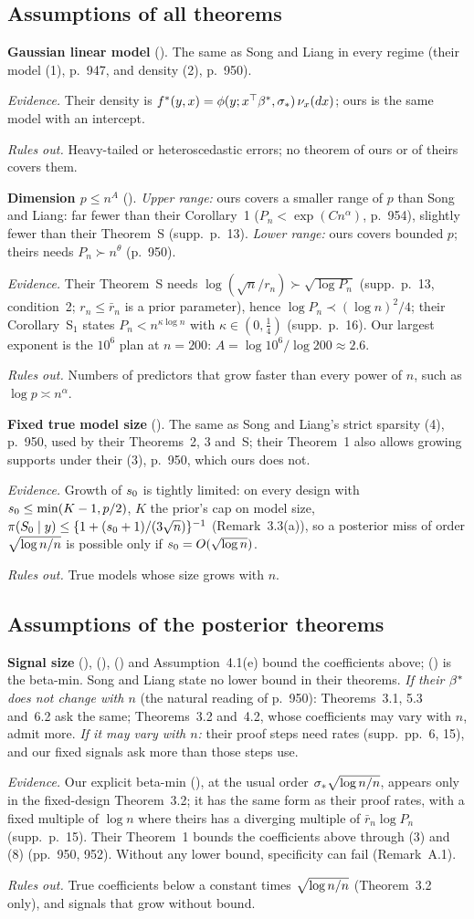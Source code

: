 \documentclass[11pt]{article}
\newcommand{\lab}[1]{\textup{(\asmdisp{#1})}}
\newcommand{\SL}{Song and Liang}
\newcommand{\ahead}[3]{\par\smallskip\noindent\textbf{#1} #2. #3\par}
\newcommand{\ev}[1]{\noindent\emph{Evidence.} #1\par}
\newcommand{\ro}[1]{\noindent\emph{Rules out.} #1\par}
\begin{document}
\subsection{Assumptions of all theorems}\label{sec:a-all}

\ahead{Gaussian linear model}{\lab{GL}}{The same as \SL{} in every regime (their model (1), p.~947, and density (2), p.~950).}
\ev{Their density is $f^*(y,x)=\phi(y;x^\top\beta^*,\sigma_*)\,\nu_x(dx)$; ours is the same model with an intercept.}
\ro{Heavy-tailed or heteroscedastic errors; no theorem of ours or of theirs covers them.}

\ahead{Dimension $p\le n^A$}{\lab{DIM}}{\emph{Upper range:} ours covers a smaller range of $p$ than \SL: far fewer than their Corollary~1
($P_n<\exp(Cn^\alpha)$, p.~954), slightly fewer than their Theorem~S (supp.\ p.~13). \emph{Lower range:} ours covers
bounded $p$; theirs needs $P_n\succ n^\theta$ (p.~950).}
\ev{Their Theorem~S needs $\log(\sqrt n/r_n)\succ\sqrt{\log P_n}$ (supp.\ p.~13, condition~2; $r_n\le\bar r_n$ is a prior parameter), hence
$\log P_n\prec(\log n)^2/4$; their Corollary~S$_1$ states $P_n<n^{\kappa\log n}$ with $\kappa\in(0,\tfrac14)$ (supp.\
p.~16). Our largest exponent is the $10^6$ plan at
$n=200$: $A=\log10^6/\log200\approx2.6$.}
\ro{Numbers of predictors that grow faster than every power of $n$, such as $\log p\asymp n^\alpha$.}

\ahead{Fixed true model size}{\lab{SP}}{The same as \SL's strict sparsity (4), p.~950, used by their Theorems~2, 3 and~S;
their Theorem~1 also allows growing supports under their (3), p.~950, which ours does not.}
\ev{Growth of $s_0$ is tightly limited: on every design with $s_0\le\min(K-1,p/2)$, $K$ the prior's cap on model
size, $\pi(S_0\mid y)\le\{1+(s_0+1)/(3\sqrt n)\}^{-1}$
(Remark~3.3(a)), so a posterior miss of order $\sqrt{\log n/n}$ is possible only if $s_0=O(\sqrt{\log n})$.}
\ro{True models whose size grows with $n$.}

\subsection{Assumptions of the posterior theorems}\label{sec:a-post}

\ahead{Signal size}{\lab{BC}, \lab{FSb}, \lab{FSt} and Assumption~4.1(e) bound the coefficients above; \lab{BM} is
the beta-min}{\SL{} state no lower bound in their theorems. \emph{If their $\beta^*$ does not change with $n$} (the natural
reading of p.~950): Theorems~3.1, 5.3 and~6.2 ask the same; Theorems~3.2 and~4.2, whose
coefficients may vary with $n$, admit more. \emph{If it may vary with $n$:} their proof steps need rates (supp.\
pp.~6, 15), and our fixed signals ask more than those steps use.}
\ev{Our explicit beta-min \lab{BM}, at the usual order $\sigma_*\sqrt{\log n/n}$,
appears only in the fixed-design Theorem~3.2; it has the same form as their proof rates, with a fixed multiple of
$\log n$ where theirs has a diverging multiple of $\bar r_n\log P_n$ (supp.\ p.~15). Their Theorem~1 bounds the
coefficients above through (3) and (8) (pp.~950, 952). Without any lower bound, specificity can fail
(Remark~A.1).}
\ro{True coefficients below a constant times $\sqrt{\log n/n}$ (Theorem~3.2 only), and signals that grow without bound.}
\end{document}
